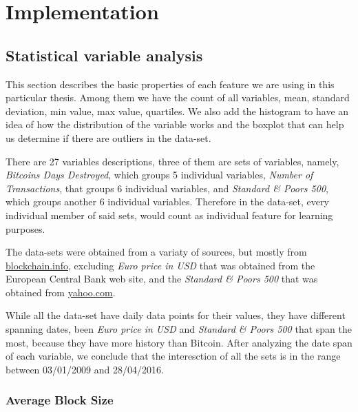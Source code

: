 
\chapter{Implementation} %

\label{ch:implementation}


\section{Statistical variable analysis}
\label{sec:stat-var-analysis}

This section describes the basic properties of each feature we are
using in this particular thesis. Among them we have the count of all
variables, mean, standard deviation, min value, max value, quartiles.
We also add the histogram to have an idea of how the distribution of
the variable works and the boxplot that can help us determine if there
are outliers in the data-set.

There are 27 variables descriptions, three of them are sets of
variables, namely, \textit{Bitcoins Days Destroyed}, which groups 5
individual variables, \textit{Number of Transactions}, that groups 6
individual variables, and \textit{Standard \& Poors 500}, which groups
another 6 individual variables. Therefore in the data-set, every
individual member of said sets, would count as individual feature for
learning purposes.

The data-sets were obtained from a variaty of sources, but mostly from
\href{blockchain.info}{blockchain.info}, excluding \textit{Euro price
  in USD} that was obtained from the European Central Bank web site,
and the \textit{Standard \& Poors 500} that was obtained from
\href{yahoo.com}{yahoo.com}.

While all the data-set have daily data points for their values, they
have different spanning dates, been \textit{Euro price in USD} and
\textit{Standard \& Poors 500} that span the most, because they have
more history than Bitcoin. After analyzing the date span of each
variable, we conclude that the interesction of all the sets is in the
range between 03/01/2009 and 28/04/2016.

\subsection{Average Block Size}
\label{sec:avg-block-size}

